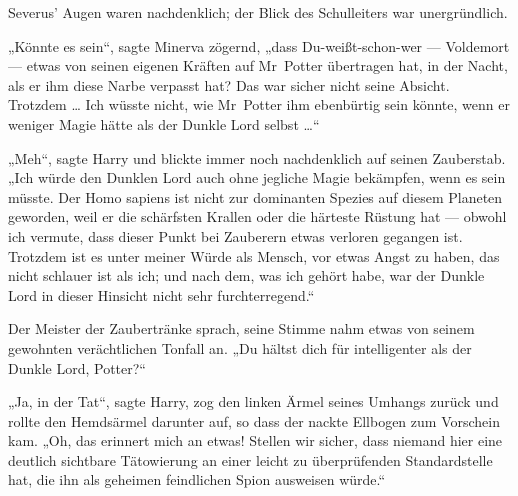 Severus’ Augen waren nachdenklich; der Blick des Schulleiters war unergründlich.

„Könnte es sein“, sagte Minerva zögernd, „dass Du-weißt-schon-wer — Voldemort — etwas von seinen eigenen Kräften auf Mr~Potter übertragen hat, in der Nacht, als er ihm diese Narbe verpasst hat? Das war sicher nicht seine Absicht. Trotzdem … Ich wüsste nicht, wie Mr~Potter ihm ebenbürtig sein könnte, wenn er weniger Magie hätte als der Dunkle Lord selbst …“

„Meh“, sagte Harry und blickte immer noch nachdenklich auf seinen Zauberstab.
„Ich würde den Dunklen Lord auch ohne jegliche Magie bekämpfen, wenn es sein müsste. Der Homo sapiens ist nicht zur dominanten Spezies auf diesem Planeten geworden, weil er die schärfsten Krallen oder die härteste Rüstung hat — obwohl ich vermute, dass dieser Punkt bei Zauberern etwas verloren gegangen ist. Trotzdem ist es unter meiner Würde als Mensch, vor etwas Angst zu haben, das nicht schlauer ist als ich; und nach dem, was ich gehört habe, war der Dunkle Lord in dieser Hinsicht nicht sehr furchterregend.“

Der Meister der Zaubertränke sprach, seine Stimme nahm etwas von seinem gewohnten verächtlichen Tonfall an.
„Du hältst dich für intelligenter als der Dunkle Lord, Potter?“

„Ja, in der Tat“, sagte Harry, zog den linken Ärmel seines Umhangs zurück und rollte den Hemdsärmel darunter auf, so dass der nackte Ellbogen zum Vorschein kam.
„Oh, das erinnert mich an etwas! Stellen wir sicher, dass niemand hier eine deutlich sichtbare Tätowierung an einer leicht zu überprüfenden Standardstelle hat, die ihn als geheimen feindlichen Spion ausweisen würde.“


